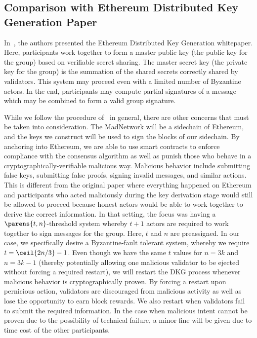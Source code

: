 \subsection{Comparison with Ethereum Distributed Key Generation Paper}
\label{ssec:ethdkg_comparison}

In~\cite{ethdkg}, the authors presented the Ethereum
Distributed Key Generation whitepaper.
Here, participants work together to form a master public key
(the public key for the group)
based on verifiable secret sharing.
The master secret key (the private key for the group)
is the summation of the shared secrets correctly shared by
validators.
This system may proceed even with a limited number of Byzantine actors.
In the end, participants may compute partial signatures of a message
which may be combined to form a valid group signature.

While we follow the procedure of~\cite{ethdkg} in general,
there are other concerns that must be taken into consideration.
The MadNetwork will be a sidechain of Ethereum,
and the keys we construct will be used to sign the blocks of our sidechain.
By anchoring into Ethereum, we are able to use smart contracts to enforce
compliance with the consensus algorithm as well as punish
those who behave in a cryptographically-verifiable malicious way.
Malicious behavior include submitting false keys, submitting
false proofs, signing invalid messages, and similar actions.
This is different from the original paper where everything
happened on Ethereum and participants who
acted maliciously during the key derivation stage would still
be allowed to proceed because honest actors would be able to
work together to derive the correct information.
In that setting, the focus was having a $\parens{t,n}$-threshold
system whereby $t+1$ actors are required to work together to
sign messages for the group.
Here, $t$ and $n$ are preassigned.
In our case, we specifically desire a Byzantine-fault tolerant
system, whereby we require $t = \ceil{2n/3}-1$.
Even though we have the same $t$ values for $n = 3k$ and $n = 3k-1$
(thereby potentially allowing one malicious validator to be
ejected without forcing a required restart),
we will restart the DKG process whenever malicious behavior
is cryptographically proven.
By forcing a restart upon pernicious action,
validators are discouraged from malicious activity as well
as lose the opportunity to earn block rewards.
We also restart when validators fail to submit the required
information.
In the case when malicious intent cannot be proven due to
the possibility of technical failure, a minor fine will be
given due to time cost of the other participants.

